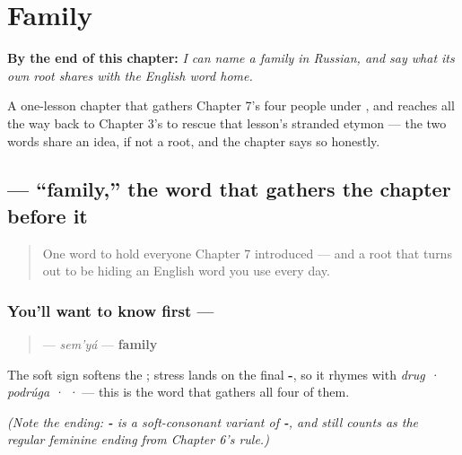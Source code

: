 
\chapter{Family}
\label{ch:russian-family}

\begin{chapteropening}
\textbf{By the end of this chapter:} \emph{I can name a family in Russian, and say what its own root shares with the English word home.}

A one-lesson chapter that gathers Chapter 7's four people under , and reaches all the way back to Chapter 3's  to rescue that lesson's stranded etymon — the two words share an idea, if not a root, and the chapter says so honestly.
\end{chapteropening}

\section[\texorpdfstring{\ru{семья} (sem'yá)}{семья (sem'yá)}]{ — \textquotedblleft{}family,\textquotedblright{} the word that gathers the chapter before it}

\label{lesson:RU-C08-semya}



\begin{quote}
One word to hold everyone Chapter 7 introduced — and a root that turns out to be hiding an English word you use every day.
\end{quote}

\subsection*{You'll want to know first — }
\begin{quote}
\textbf{} — \emph{sem'yá} — \textbf{family}
\end{quote}

The soft sign softens the \textbf{}; stress lands on the final \textbf{-}, so it rhymes with \emph{drug · podrúga ·  · } — this is the word that gathers all four of them.

\emph{(Note the ending: \textbf{-} is a soft-consonant variant of \textbf{-}, and still counts as the regular feminine ending from Chapter 6's rule.)}

